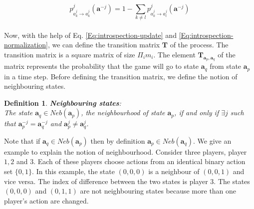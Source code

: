 \documentclass[11pt]{article}
\theoremstyle{plainCl1}
\newtheorem{definition}{Definition}
\theoremstyle{plainCl2}
\newcommand{\abf}{\mathbf{a}}
\newcommand{\T}{\mathbf{T}}
\begin{document}
\begin{equation}
 p^j_{a^j_k \to a^j_k} (\abf^{-j}) = 1 - \sum_{k \neq l} p^j_{a^j_k \to a^j_l} (\abf^{-j})
 \label{Eq:introspection-normalization}
\end{equation}
\\ 
\noindent Now, with the help of Eq. \ref{Eq:introspection-update} and \ref{Eq:introspection-normalization}, we can define the transition matrix $\T$ of the process. The transition matrix is a square matrix of size $\Pi_i m_i$. The element $\T_{\abf_p, \abf_q}$ of the matrix represents the probability that the game will go to state $\abf_q$ from state $\abf_p$ in a time step. Before defining the transition matrix, we define the notion of neighbouring states. 

\begin{definition}
\textbf{Neighbouring states}: \\ The state $\abf_q \in \mathit{Neb}(\abf_p)$, the neighbourhood of state $\abf_p$, if and only if $\exists j$ such that $\abf_p^{-j} = \abf_q^{-j}$ and $\abf_p^{j} \neq \abf_q^{j}$. 
\label{Def:neighbourhood-states}
\end{definition}
\noindent Note that if $\abf_q \in \mathit{Neb}(\abf_p)$ then by definition $\abf_p \in \mathit{Neb}(\abf_q)$. We give an example to explain the notion of neighbourhood. Consider three players, player $1,2$ and $3$. Each of these players choose actions from an identical binary action set $\{\mathit{0},\mathit{1}\}$. In this example, the state $(\mathit{0}, \mathit{0}, \mathit{0})$ is a neighbour of $(\mathit{0}, \mathit{0}, \mathit{1})$ and vice versa. The index of difference between the two states is player $3$. The states  $(\mathit{0}, \mathit{0}, \mathit{0})$ and $(\mathit{0}, \mathit{1}, \mathit{1})$ are not neighbouring states because more than one player's action are changed. 
\end{document}
